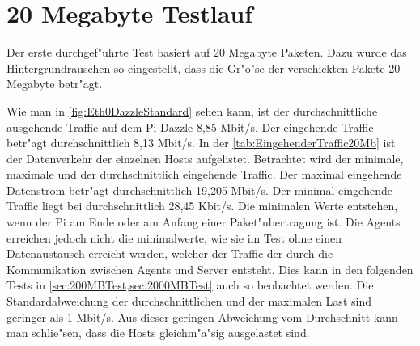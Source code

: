 \section{20 Megabyte Testlauf}
\label{subsec:20MBTest}
Der erste durchgef"uhrte Test basiert auf 20 Megabyte Paketen. Dazu wurde das Hintergrundrauschen %
so eingestellt, dass die Gr"o"se der verschickten Pakete 20 Megabyte betr"agt. 

Wie man in \cref{fig:Eth0DazzleStandard} sehen kann, ist der durchschnittliche ausgehende Traffic auf dem Pi Dazzle 8,85 Mbit/s. %
Der eingehende Traffic betr"agt durchschnittlich 8,13 Mbit/s. In der \cref{tab:EingehenderTraffic20Mb} %
ist der Datenverkehr der einzelnen Hosts aufgelistet. Betrachtet wird der minimale, maximale und der durchschnittlich eingehende Traffic. %
Der maximal eingehende Datenstrom betr"agt durchschnittlich 19,205 Mbit/s. Der minimal eingehende Traffic liegt bei %
durchschnittlich 28,45 Kbit/s. Die minimalen Werte entstehen, wenn der Pi am Ende oder am Anfang einer Paket"ubertragung ist. %
Die Agents erreichen jedoch nicht die minimalwerte, wie sie im Test ohne einen Datenaustausch erreicht werden, welcher der Traffic %
der durch die Kommunikation zwischen Agents und Server entsteht. %
Dies kann in den folgenden Tests in \cref{sec:200MBTest,sec:2000MBTest} auch so beobachtet werden. Die Standardabweichung der durchschnittlichen %
und der maximalen Last sind geringer als 1 Mbit/s. Aus dieser geringen Abweichung vom Durchschnitt kann man schlie"sen, dass die Hosts %
gleichm"a"sig ausgelastet sind. %

